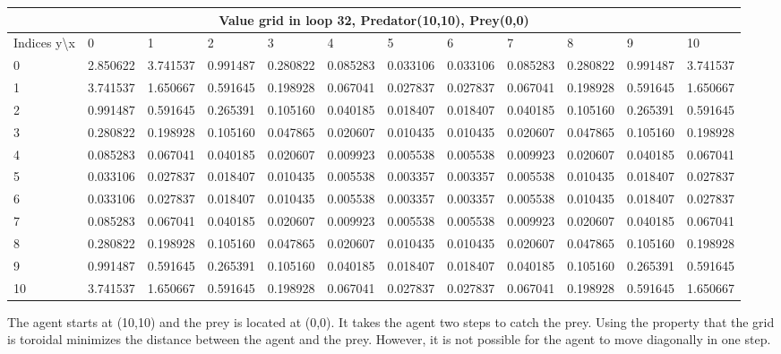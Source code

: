 \documentclass{article}
\begin{document}
\begin{center}
\scalebox{0.7}
	{
	\begin{tabular}{ |l | l | l | l | l | l | l | l | l | l | l | l|}
	\hline
	\multicolumn{12}{|c|}{Value grid in loop 32, Predator(10,10), Prey(0,0)}\\
	\hline
	Indices y\textbackslash x &0 & 1 & 2 & 3 & 4 & 5 & 6 & 7 & 8 & 9 & 10 \\ 

\hline
0 & \cellcolor{red!40} 2.850622 & 3.741537 & 0.991487 & 0.280822 & 0.085283 & 0.033106 & 0.033106 & 0.085283 & 0.280822 & 0.991487 & 3.741537 \\
1 & 3.741537 & 1.650667 & 0.591645 & 0.198928 & 0.067041 & 0.027837 & 0.027837 & 0.067041 & 0.198928 & 0.591645 & 1.650667 \\
2 & 0.991487 & 0.591645 & 0.265391 & 0.105160 & 0.040185 & 0.018407 & 0.018407 & 0.040185 & 0.105160 & 0.265391 & 0.591645 \\
3 & 0.280822 & 0.198928 & 0.105160 & 0.047865 & 0.020607 & 0.010435 & 0.010435 & 0.020607 & 0.047865 & 0.105160 & 0.198928 \\
4 & 0.085283 & 0.067041 & 0.040185 & 0.020607 & 0.009923 & 0.005538 & 0.005538 & 0.009923 & 0.020607 & 0.040185 & 0.067041 \\
5 & 0.033106 & 0.027837 & 0.018407 & 0.010435 & 0.005538 & 0.003357 & 0.003357 & 0.005538 & 0.010435 & 0.018407 & 0.027837 \\
6 & 0.033106 & 0.027837 & 0.018407 & 0.010435 & 0.005538 & 0.003357 & 0.003357 & 0.005538 & 0.010435 & 0.018407 & 0.027837 \\
7 & 0.085283 & 0.067041 & 0.040185 & 0.020607 & 0.009923 & 0.005538 & 0.005538 & 0.009923 & 0.020607 & 0.040185 & 0.067041 \\
8 & 0.280822 & 0.198928 & 0.105160 & 0.047865 & 0.020607 & 0.010435 & 0.010435 & 0.020607 & 0.047865 & 0.105160 & 0.198928 \\
9 & 0.991487 & 0.591645 & 0.265391 & 0.105160 & 0.040185 & 0.018407 & 0.018407 & 0.040185 & 0.105160 & 0.265391 & 0.591645 \\
10 & 3.741537 & 1.650667 & 0.591645 & 0.198928 & 0.067041 & 0.027837 & 0.027837 & 0.067041 & 0.198928 & 0.591645 & \cellcolor{green!40}1.650667 \\

\hline
	\end{tabular}
	}
\end{center}

The agent starts at (10,10) and the prey is located at (0,0). It takes the agent two steps to catch the prey. Using the property that the grid is toroidal minimizes the distance between the agent and the prey. However, it is not possible for the agent to move diagonally in one step.
\end{document}
